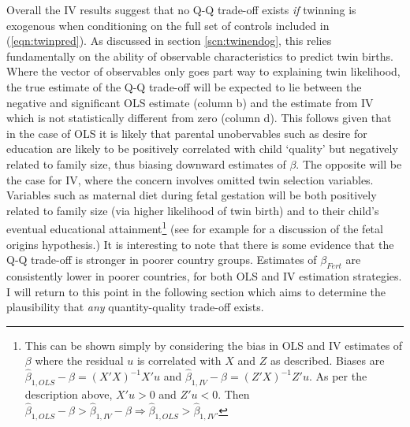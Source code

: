 \documentclass{article}[11pt,subeqn]
\begin{document}
\begin{spacing}{1.5}
Overall the IV results suggest that no Q-Q trade-off exists \emph{if} twinning is exogenous when conditioning on the full set of controls included in (\ref{eqn:twinpred}).  
As discussed in section \ref{scn:twinendog}, this relies fundamentally on the ability of observable characteristics to predict twin births.  Where the vector of observables 
only goes part way to explaining twin likelihood, the true estimate of the Q-Q trade-off will be expected to lie between the negative and significant OLS estimate (column b) 
and the estimate from IV which is not statistically different from zero (column d).  This follows given that in the case of OLS it is likely that parental unobervables such as 
desire for education are likely to be positively correlated with child `quality' but negatively related to family size, thus biasing downward estimates of $\beta$.  The opposite 
will be the case for IV, where the concern involves omitted twin selection variables.  Variables such as maternal diet during fetal gestation will be both positively related to 
family size (via higher likelihood of twin birth) and to their child's eventual educational attainment\footnote{This can be shown simply by considering the bias in OLS and IV
estimates of $\beta$ where the residual $u$ is correlated with $X$ and $Z$ as described.  Biases are $\hat{\beta}_{1,OLS}-\beta=(X'X)^{-1}X'u$ and $\hat{\beta}_{1,IV}-\beta=(Z'X)^{-1}Z'u$.
As per the description above, $X'u>0$ and $Z'u<0$.  Then $\hat{\beta}_{1,OLS}-\beta>\hat{\beta}_{1,IV}-\beta\Rightarrow\hat{\beta}_{1,OLS}>\hat{\beta}_{1,IV}$.}
 (see for example \citet{Barker1995} for a discussion of the fetal origins 
hypothesis.)  It is interesting to note that there is some evidence that the Q-Q trade-off is stronger in poorer country groups.  Estimates of $\beta_{Fert}$ are 
consistently lower in poorer countries, for both OLS and IV estimation strategies.  I will return to this point in the following section which aims to determine the plausibility 
that \emph{any} quantity-quality trade-off exists.






\end{spacing}
\end{document}
